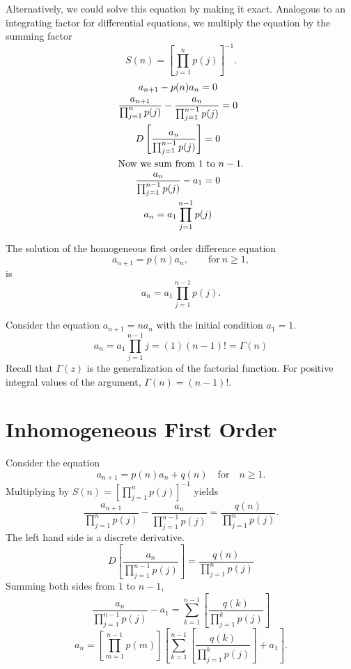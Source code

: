 Alternatively, we could solve this equation by making it exact. 
Analogous to an integrating factor for differential equations,  
we multiply the equation by the summing factor
\[S(n) = \left[\prod_{j=1}^{n} p(j) \right]^{-1}. \] 
\begin{gather*} 
  a_{n+1} - p(n) a_n = 0 \\ 
  \frac{a_{n+1}}{\prod_{j=1}^{n} p(j)} - \frac{a_n}{\prod_{j=1}^{n-1} p(j)}=0\\ 
  D \left[\frac{a_n}{\prod_{j=1}^{n-1} p(j)} \right] = 0 \\ 
  \intertext{Now we sum from $1$ to $n-1$.} 
  \frac{a_n}{\prod_{j=1}^{n-1} p(j)} - a_1 = 0 \\ 
  a_n = a_1 \prod_{j=1}^{n-1} p(j) 
\end{gather*} 




\begin{Result} 
  The solution of the homogeneous first order difference equation
  \[ a_{n+1} = p(n)a_n, \qquad \mathrm{for}\ n \geq 1, \] 
  is  
  \[a_n = a_1 \prod_{j=1}^{n-1} p(j). \] 
\end{Result} 



\begin{Example} 
  Consider the equation $a_{n+1} = n a_n$ with the initial condition
  $a_1 = 1$. 
  \[      a_n = a_1 \prod_{j=1}^{n-1} j = (1) (n-1)!  
  = \Gamma(n) \] 
  Recall that $\Gamma(z)$ is the generalization of the factorial function.  For 
  positive integral values of the argument, $\Gamma(n) = (n-1)!$. 
\end{Example} 


\section{Inhomogeneous First Order}
Consider the equation
\[a_{n+1} = p(n) a_n + q(n) \quad \mathrm{for} \quad n \geq 1. \]
Multiplying by $S(n)= \left[ \prod_{j=1}^{n} p(j) \right]^{-1}$ yields
\[ \frac{a_{n+1}}{\prod_{j=1}^{n} p(j)} - \frac{a_n}{\prod_{j=1}^{n-1} p(j)}
= \frac{q(n)}{\prod_{j=1}^{n} p(j)}.  \]
The left hand side is a discrete derivative.
\[ D \left[ \frac{a_n}{\prod_{j=1}^{n-1} p(j)} \right] = 
\frac{q(n)}{\prod_{j=1}^{n} p(j)} \]
Summing both sides from $1$ to $n-1$, 
\[ \frac{a_n}{\prod_{j=1}^{n-1} p(j)} - a_1 = 
\sum_{k=1}^{n-1} \left[ \frac{q(k)}{\prod_{j=1}^{k} p(j)} \right] \]
\[ a_n = \left[ \prod_{m=1}^{n-1} p(m) \right]
\left[ \sum_{k=1}^{n-1} \left[ \frac{q(k)}{\prod_{j=1}^{k} p(j)} 
  \right] + a_1  \right].   \]


